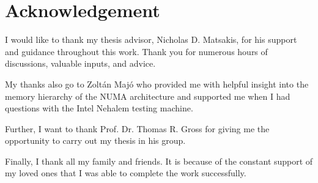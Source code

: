 
\chapter*{Acknowledgement}

I would like to thank my thesis advisor, Nicholas D. Matsakis, for his
support and guidance throughout this work. Thank you for numerous
hours of discussions, valuable inputs, and advice.

My thanks also go to Zoltán Majó who provided me with helpful insight
into the memory hierarchy of the NUMA architecture and supported me
when I had questions with the Intel Nehalem testing machine.

Further, I want to thank Prof. Dr. Thomas R. Gross for giving me the
opportunity to carry out my thesis in his group.

Finally, I thank all my family and friends. It is because of the
constant support of my loved ones that I was able to complete the work
successfully.


